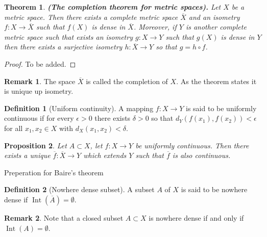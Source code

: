 \documentclass[11pt,a4paper]{article}
\theoremstyle{definition}
\newtheorem{definition}{Definition}[section]
\newtheorem{remark}{Remark}[section]
\theoremstyle{plain}
\newtheorem{theorem}{Theorem}[section]
\newtheorem{proposition}[theorem]{Proposition}
\DeclareMathOperator{\Int}{Int}
\renewcommand{\tt}[1]{\textnormal{\textbf{(#1).}}} %
\begin{document}
  \begin{theorem}
    \tt{The completion theorem for metric spaces}
    Let $X$ be a metric space. Then there exists a complete metric space
    $\overline{X}$ and an isometry $f \colon X \to \overline{X}$ such that 
    $f(X)$ is dense in $\overline{X}$. Moreover, if $Y$ is another complete 
    metric space such that exists an isometry $g \colon X \to Y$ such that
    $g(X)$ is dense in $Y$ then there exists a surjective isometry
    $h \colon \overline{X} \to Y$ so that $g = h \circ f$.
  \end{theorem}
  \begin{proof}
    To be added.
  \end{proof}

  \begin{remark}
    The space $\overline{X}$ is called the completion of $X$. As the theorem
    states it is unique up isometry.
  \end{remark}
  
  \begin{definition}[Uniform continuity]
    A mapping $f \colon X \to Y$ is said to be uniformly continuous if for
    every $\epsilon > 0$ there exists $\delta > 0$ so that 
    $d_Y(f(x_1),f(x_2)) < \epsilon$ for all $x_1,x_2 \in X$ with 
    $d_X(x_1,x_2) < \delta$.
  \end{definition}
  
  \begin{proposition}
    Let $A \subset X$, let $f \colon X \to Y$ be uniformly continuous.
    Then there exists a unique $\overline{f} \colon \overline{X} \to Y$ 
    which extends $Y$ such that $\overline{f}$ is also continuous.
  
  \end{proposition}
  
  Preperation for Baire's theorem
  
  \begin{definition}[Nowhere dense subset]
    A subset $A$ of $X$ is said to be nowhere dense if 
    $\Int\left(\overline A\right) = \emptyset$.
  \end{definition}
  
  \begin{remark}
    Note that a closed subset $A \subset X$ is nowhere dense if and only if 
    $\Int(A) = \emptyset$.
  \end{remark}
  
\end{document}
